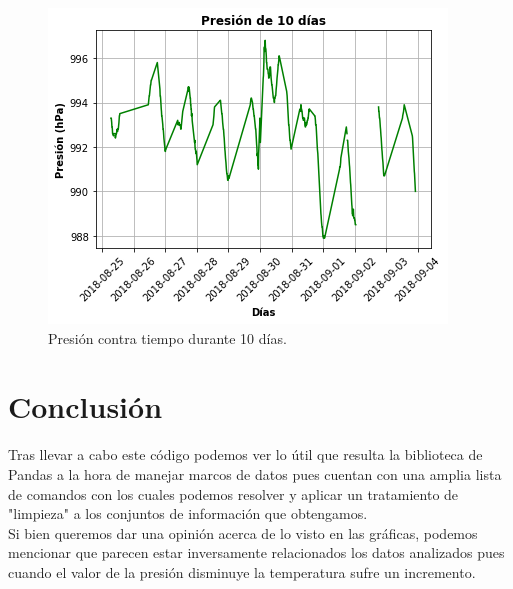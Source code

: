\documentclass[12pt]{article}
\begin{document}
\begin{figure}[h!]
	\center
	\includegraphics[scale=.6]{Pres10}
	\caption{\label{fig:pres} Presión contra tiempo durante 10 días.}
\end{figure}

\section{Conclusión}

Tras llevar a cabo este código podemos ver lo útil que resulta la biblioteca de Pandas a la hora de manejar marcos de datos pues cuentan con una amplia lista de comandos con los cuales podemos resolver y aplicar un tratamiento de "limpieza" a los conjuntos de información que obtengamos. \\
\indent Si bien queremos dar una opinión acerca de lo visto en las gráficas, podemos mencionar que parecen estar inversamente relacionados los datos analizados pues cuando el valor de la presión disminuye la temperatura sufre un incremento.
\end{document}
